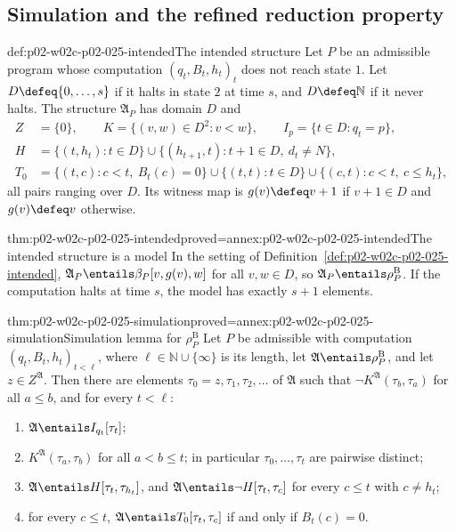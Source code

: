 \subsection{Simulation and the refined reduction property}
\label{sec:p02-w02c-p02-025-reduction}

\begin{hbdefinition}{def:p02-w02c-p02-025-intended}{The intended structure}
Let \(P\) be an admissible program whose computation
\((q_t,B_t,h_t)_t\) does not reach state \(1\).  Let \(D\defeq\{0,\ldots,s\}\)
if it halts in state \(2\) at time \(s\), and \(D\defeq\mathbb N\) if it never
halts.  The structure \(\mathfrak A_P\) has domain \(D\) and
\[
\begin{aligned}
 Z&=\{0\},\qquad K=\{(v,w)\in D^2:v<w\},\qquad I_p=\{t\in D:q_t=p\},\\
 H&=\{(t,h_t):t\in D\}\cup\{(h_{t+1},t):t+1\in D,\ d_t\neq N\},\\
 T_0&=\{(t,c):c<t,\ B_t(c)=0\}\cup\{(t,t):t\in D\}\cup
     \{(c,t):c<t,\ c\leq h_t\},
\end{aligned}
\]
all pairs ranging over \(D\).  Its witness map is \(g(v)\defeq v+1\) if
\(v+1\in D\) and \(g(v)\defeq v\) otherwise.
\end{hbdefinition}

\begin{hblemma}{thm:p02-w02c-p02-025-intended}{proved=annex:p02-w02c-p02-025-intended}{The intended structure is a model}
In the setting of Definition~\ref{def:p02-w02c-p02-025-intended},
\(\mathfrak A_P\entails\beta_P[v,g(v),w]\) for all \(v,w\in D\), so
\(\mathfrak A_P\entails\rho^{\mathrm B}_P\).  If the computation halts at time
\(s\), the model has exactly \(s+1\) elements.
\end{hblemma}

\begin{hblemma}{thm:p02-w02c-p02-025-simulation}{proved=annex:p02-w02c-p02-025-simulation}{Simulation lemma for \(\rho^{\mathrm B}_P\)}
Let \(P\) be admissible with computation \((q_t,B_t,h_t)_{t<\ell}\), where
\(\ell\in\mathbb N\cup\{\infty\}\) is its length, let
\(\mathfrak A\entails\rho^{\mathrm B}_P\), and let \(z\in Z^{\mathfrak A}\).
Then there are elements \(\tau_0=z,\tau_1,\tau_2,\ldots\) of \(\mathfrak A\)
such that \(\neg K^{\mathfrak A}(\tau_b,\tau_a)\) for all \(a\leq b\), and for
every \(t<\ell\):
\begin{enumerate}
\item \(\mathfrak A\entails I_{q_t}[\tau_t]\);
\item \(K^{\mathfrak A}(\tau_a,\tau_b)\) for all \(a<b\leq t\); in particular
      \(\tau_0,\ldots,\tau_t\) are pairwise distinct;
\item \(\mathfrak A\entails H[\tau_t,\tau_{h_t}]\), and
      \(\mathfrak A\entails\neg H[\tau_t,\tau_c]\) for every \(c\leq t\) with
      \(c\neq h_t\);
\item for every \(c\leq t\), \(\mathfrak A\entails T_0[\tau_t,\tau_c]\) if and
      only if \(B_t(c)=0\).
\end{enumerate}
\end{hblemma}

